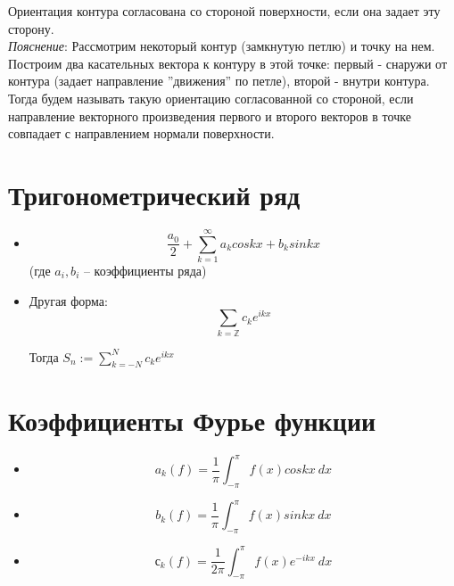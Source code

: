 \documentclass[paper=a4, fontsize=17pt]{article}
\begin{document}
	Ориентация контура согласована со стороной поверхности, если она задает эту сторону.\\
	
	\emph{Пояснение}: 
	Рассмотрим некоторый контур (замкнутую петлю) и точку на нем. Построим два касательных вектора к контуру в этой точке: первый - снаружи от контура (задает направление ''движения'' по петле), второй - внутри контура. Тогда будем называть такую ориентацию согласованной со стороной, если направление векторного произведения первого и второго векторов в точке совпадает с направлением нормали поверхности.
	
	\begin{center}
	\end{center}
	
	\section{Тригонометрический ряд}

	\begin{itemize}
		\item $$ \frac{a_0}{2}  + \sum_{k = 1}^{\infty} a_k coskx + b_k sinkx $$ 
		(где $ a_i, b_i $ -- коэффициенты ряда)
		
		\item Другая форма:	$$ \sum_{k = \mathbb{Z}} c_k e^{ikx} $$
		
		Тогда $ S_n := \sum_{k = -N}^{N} c_k e^{ikx} $
	\end{itemize}

	\section{Коэффициенты Фурье функции}

	\begin{itemize}
		\item $$ a_k(f) = \frac{1}{\pi} \int_{-\pi}^{\pi} f(x) coskx ~ dx $$
		
		\item $$ b_k(f) = \frac{1}{\pi} \int_{-\pi}^{\pi} f(x) sinkx ~ dx $$
		
		\item $$ с_k(f) = \frac{1}{2\pi} \int_{-\pi}^{\pi} f(x) e^{-ikx} ~ dx $$
		
	\end{itemize}
\end{document}
